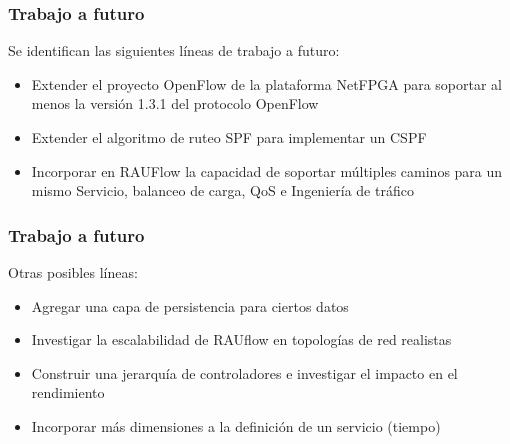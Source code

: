 \documentclass{beamer}
\begin{document}
\begin{frame}
\frametitle{Trabajo a futuro} 

Se identifican las siguientes l\'ineas de trabajo a futuro:

\begin{itemize}

\item Extender el proyecto OpenFlow de la plataforma NetFPGA para soportar al menos la versi\'on 1.3.1 del protocolo OpenFlow

\item Extender el algoritmo de ruteo SPF para implementar un CSPF

\item Incorporar en RAUFlow la capacidad de soportar m\'ultiples caminos para un mismo Servicio,  balanceo de carga, QoS e Ingenier\'ia de tr\'afico

\end{itemize}

\end{frame}

\begin{frame}
\frametitle{Trabajo a futuro} 

Otras posibles l\'ineas:

\begin{itemize}

\item Agregar una capa de persistencia para ciertos datos

\item Investigar la escalabilidad de RAUflow en topolog\'ias de red realistas 

\item Construir una jerarqu\'ia de controladores e investigar el impacto en el rendimiento 

\item Incorporar m\'as dimensiones a la definici\'on de un servicio (tiempo)

\end{itemize}

\end{frame}


\end{document}
